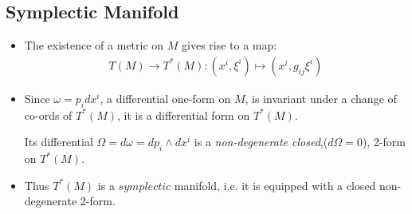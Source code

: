 \documentclass[11pt]{article}
\numberwithin{equation}{section}
\begin{document}
\subsection{Symplectic Manifold} %
\label{sub:symplectic_manifold}
\begin{itemize}
    \item The existence of a metric on $M$ gives rise to a map:
  \begin{align*}
   T(M) \rightarrow T^{\ast}(M): (x^i,\xi^i)\mapsto (x^i,g_{ij}\xi^i)
   \end{align*} 
   \item Since $\omega = p_idx^i$, a differential one-form on $M$, is invariant under a change of co-ords of $T^{\ast}(M)$, it is a differential form on $T^{\ast}(M)$. 

   Its differential $\Omega = d\omega = dp_i \wedge dx^i$ is a \emph{non-degenerate closed},($d\Omega =0$), 2-form on $T^{\ast}(M)$. 

   \item Thus $T^{\ast}(M)$ is a $symplectic$ manifold, i.e. it is equipped with a closed non-degenerate 2-form. 
 \end{itemize}
\end{document}
